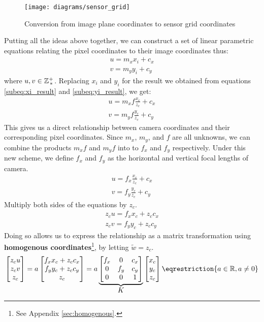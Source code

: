\begin{figure}[H]
    \centering
    \texttt{[image: diagrams/sensor\_grid]}
    \caption{Conversion from image plane coordinates to sensor grid coordinates}
\end{figure}
Putting all the ideas above together, we can construct a set of linear parametric equations relating the pixel coordinates to their image coordinates thus:
\begin{align*}
    u = m_x x_i + c_x \\
    v = m_y y_i + c_y
\end{align*}
where $u, v \in \mathbb{Z}^+_{\,*}$. Replacing $x_i$ and $y_i$ for the result we obtained from equations \ref{subeq:xi_result} and \ref{subeq:yi_result}, we get:
\begin{align*}
    u = m_x f \frac{x_c}{z_c} + c_x \\
    v = m_y f \frac{y_c}{z_c} + c_y
\end{align*}
This gives us a direct relationship between camera coordinates and their corresponding pixel coordinates. Since $m_x$, $m_y$, and $f$ are all unknowns, we can combine the products $m_x f$ and $m_y f$ into to $f_x$ and $f_y$ respectively. Under this new scheme, we define $f_x$ and $f_y$ as the horizontal and vertical focal lengths of camera.
\begin{gather}
    u = f_x \frac{x_c}{z_c} + c_x \\
    v = f_y \frac{y_c}{z_c} + c_y
\end{gather}
Multiply both sides of the equations by $z_c$.
\begin{subequations}
    \begin{gather*}
        z_c u = f_x x_c + z_c c_x \\
        z_c v = f_y y_c + z_c c_y
    \end{gather*}
\end{subequations}
Doing so allows us to express the relationship as a matrix transformation using \textbf{homogenous coordinates}\footnote{See Appendix \ref{sec:homogenous}.}, by letting $\widetilde{w} = z_c$.
\begin{equation}
    \begin{bmatrix}
        z_c u \\ z_c v \\ z_c
    \end{bmatrix}
    =
    a
    \begin{bmatrix}
        f_x x_c + z_c c_x \\ f_y y_c + z_c c_y \\ z_c
    \end{bmatrix}
    =
    a
    \underbrace{
        \begin{bmatrix}
            f_x & 0   & c_x \\
            0   & f_y & c_y \\
            0   & 0   & 1
        \end{bmatrix}
    }_{\mathlarger{K}}
    \begin{bmatrix}
        x_c \\ y_c \\ z_c
    \end{bmatrix}
    \eqrestriction{a \in \Real, a \neq 0}
\end{equation}
